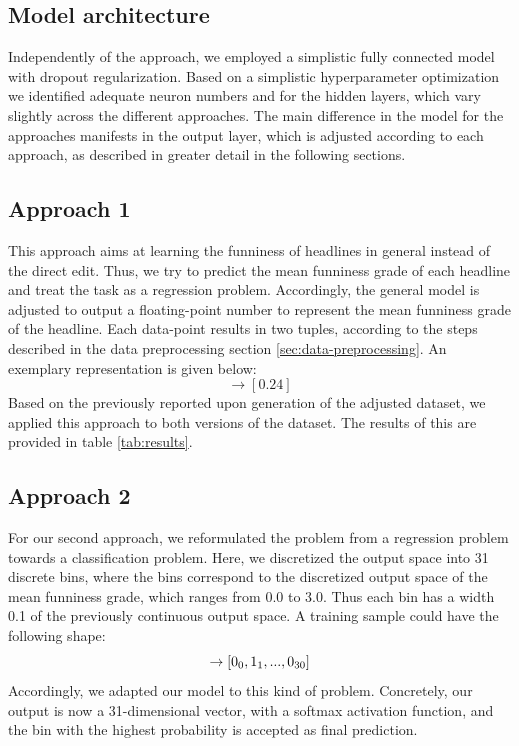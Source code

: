 \documentclass[11pt,a4paper]{article}
\begin{document}
\subsection{Model architecture}
Independently of the approach, we employed a simplistic fully connected model with dropout regularization. Based on a simplistic hyperparameter optimization we identified adequate neuron numbers and for the hidden layers, which vary slightly across the different approaches. The main difference in the model for the approaches manifests in the output layer, which is adjusted according to each approach, as described in greater detail in the following sections. 
\subsection{Approach 1}
This approach aims at learning the funniness of headlines in general instead of the direct edit. Thus, we try to predict the mean funniness grade of each headline and treat the task as a regression problem. Accordingly, the general model is adjusted to output a floating-point number to represent the mean funniness grade of the headline. Each data-point results in two tuples, according to the steps described in the data preprocessing section \ref{sec:data-preprocessing}. An exemplary representation is given below:
\begin{equation}
    [0,0,0.83,0.4,0.6,0.13,0.24] \rightarrow  [0.24]
\end{equation}
Based on the previously reported upon generation of the adjusted dataset, we applied this approach to both versions of the dataset. The results of this are provided in table \ref{tab:results}.

\subsection{Approach 2}
For our second approach, we reformulated the problem from a regression problem towards a classification problem. Here, we discretized the output space into 31 discrete bins, where the bins correspond to the discretized output space of the mean funniness grade, which ranges from 0.0 to 3.0. Thus each bin has a width 0.1 of the previously continuous output space. 
A training sample could have the following shape: 
\begin{equation}
    [0,0,0.83,0.4,0.6,0.13,0.24] \rightarrow  [0\textsubscript{0},1\textsubscript{1},..., 0\textsubscript{30}]
\end{equation}
Accordingly, we adapted our model to this kind of problem. Concretely, our output is now a {31-dimensional} vector, with a softmax activation function, and the bin with the highest probability is accepted as final prediction.
\end{document}
